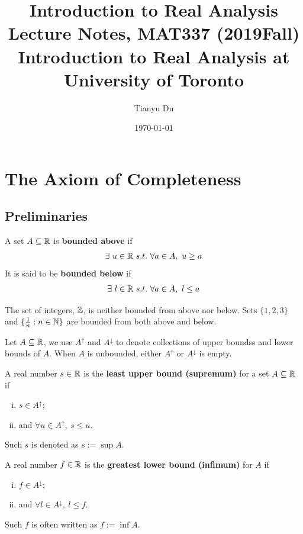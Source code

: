 \documentclass[11pt]{article}
\title{Introduction to Real Analysis \\ \normalsize{Lecture Notes, MAT337 (2019Fall) Introduction to Real Analysis at University of Toronto}}
\date{\today}
\author{Tianyu Du}
\begin{document}
	\maketitle
	\doclicenseThis
	\tableofcontents
	\newpage
	\section{The Axiom of Completeness}
	\subsection{Preliminaries}
	\begin{definition}
		A set $A \subseteq \mathbb{R}$ is \textbf{bounded above} if
		\begin{align}
			\exists\ u \in \mathbb{R}\ s.t.\ \forall a \in A,\ u \geq a
		\end{align} 
		It is said to be \textbf{bounded below} if
		\begin{align}
			\exists\ l \in \mathbb{R}\ s.t.\ \forall a \in A,\ l \leq a
		\end{align}
	\end{definition}
	
	\begin{example}
		The set of integers, $\mathbb{Z}$, is neither bounded from above nor below. Sets $\{1, 2, 3\}$ and $\{\frac{1}{n}: n \in \mathbb{N} \}$ are bounded from both above and below.
	\end{example}
	
	\begin{notation}
		Let $A \subseteq \mathbb{R}$, we use $A^\uparrow$ and $A^\downarrow$ to denote collections of upper boundss and lower bounds of $A$. When $A$ is unbounded, either $A^\uparrow$ or $A^\downarrow$ is empty.
	\end{notation}
	
	\begin{definition}
		A real number $s \in \mathbb{R}$ is the \textbf{least upper bound (supremum)} for a set $A \subseteq \mathbb{R}$ if 
		\begin{enumerate}[(i)]
			\item $s \in A^\uparrow$;
			\item and $\forall u \in A^\uparrow,\ s \leq u$.
		\end{enumerate} Such $s$ is denoted as $s := \sup A$.
	\end{definition}
	
	\begin{definition}
		A real number $f \in \mathbb{R}$ is the \textbf{greatest lower bound (infimum)} for $A$ if 
		\begin{enumerate}[(i)]
			\item $f \in A^\downarrow$;
			\item and $\forall l \in A^\downarrow,\ l \leq f$.	
		\end{enumerate}
		Such $f$ is often written as $f := \inf A$.
	\end{definition}
	
\end{document}
